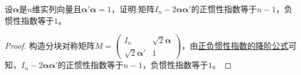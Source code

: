 \documentclass[../../main.tex]{subfiles}
\begin{document}
\begin{proposition}
设\(\boldsymbol{\alpha}\)是\(n\)维实列向量且\(\boldsymbol{\alpha}'\boldsymbol{\alpha}=1\)，证明:矩阵\(I_n - 2\boldsymbol{\alpha}\boldsymbol{\alpha}'\)的正惯性指数等于\(n - 1\)，负惯性指数等于\(1\)。
\end{proposition}
\begin{proof}
构造分块对称矩阵\(M = \begin{pmatrix}
I_n & \sqrt{2}\boldsymbol{\alpha} \\
\sqrt{2}\boldsymbol{\alpha}' & 1
\end{pmatrix}\)，由\hyperref[proposition:正负惯性指数的降阶公式]{正负惯性指数的降阶公式}可知，\(I_n - 2\boldsymbol{\alpha}\boldsymbol{\alpha}'\)的正惯性指数等于\(n - 1\)，负惯性指数等于\(1\)。

\end{proof}
\end{document}
